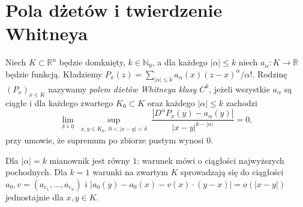 \section{Pola dżetów i twierdzenie Whitneya}
\begin{definicja}
\label{def:dzety-whitney-field}
Niech $K\subset\mathbb R^n$ będzie domknięty,
$k\in\mathbb N_0$, a dla każdego $|\alpha|\le k$
niech $a_\alpha:K\to\mathbb R$ będzie funkcją.
Kładziemy $P_x(z)=\sum_{|\alpha|\le k}
 a_\alpha(x)(z-x)^\alpha/\alpha!$.
Rodzinę $(P_x)_{x\in K}$ nazywamy
\emph{polem dżetów Whitneya klasy $C^k$}, jeżeli
wszystkie $a_\alpha$ są ciągłe i dla każdego zwartego
$K_0\subset K$ oraz każdego $|\alpha|\le k$ zachodzi
\[
 \lim_{\delta\downarrow0}
 \sup_{\substack{x,y\in K_0,\;0<|x-y|<\delta}}
 \frac{|D^\alpha P_x(y)-a_\alpha(y)|}
 {|x-y|^{k-|\alpha|}}=0,
\]
przy umowie, że supremum po zbiorze pustym wynosi $0$.
\end{definicja}

\begin{uwaga}
Dla $|\alpha|=k$ mianownik jest równy $1$:
warunek mówi o ciągłości najwyższych pochodnych.
Dla $k=1$ warunki na zwartym $K$ sprowadzają się do
ciągłości $a_0,v=(a_{e_1},\ldots,a_{e_n})$ i
$|a_0(y)-a_0(x)-v(x)\cdot(y-x)|=o(|x-y|)$
jednostajnie dla $x,y\in K$.
\end{uwaga}

